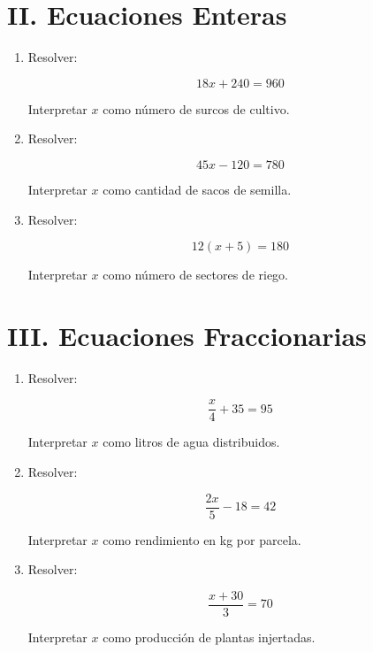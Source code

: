 \documentclass[11pt]{article}
\begin{document}
	\section*{II. Ecuaciones Enteras}
	
	\begin{enumerate}[label=\textbf{\arabic*.}, start=3]
		
		\item Resolver:
		
		\[
		18x + 240 = 960
		\]
		
		Interpretar \(x\) como número de surcos de cultivo.
		
		
		\item Resolver:
		
		\[
		45x - 120 = 780
		\]
		
		Interpretar \(x\) como cantidad de sacos de semilla.
		
		
		\item Resolver:
		
		\[
		12(x+5)=180
		\]
		
		Interpretar \(x\) como número de sectores de riego.
		
	\end{enumerate}
	
	\newpage
	\vspace*{0.2cm}
		
	\section*{III. Ecuaciones Fraccionarias}
	
	\begin{enumerate}[label=\textbf{\arabic*.}, start=6]
		
		\item Resolver:
		
		\[
		\frac{x}{4} + 35 = 95
		\]
		
		Interpretar \(x\) como litros de agua distribuidos.
		
		
		\item Resolver:
		
		\[
		\frac{2x}{5} - 18 = 42
		\]
		
		Interpretar \(x\) como rendimiento en kg por parcela.
		
		
		\item Resolver:
		
		\[
		\frac{x+30}{3}=70
		\]
		
		Interpretar \(x\) como producción de plantas injertadas.
		
	\end{enumerate}
	
\end{document}
